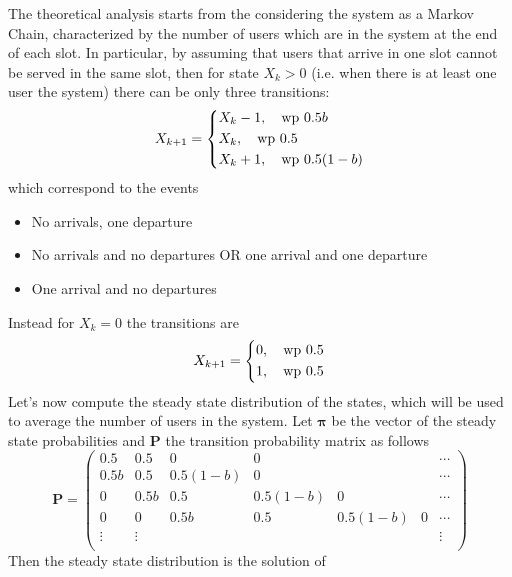 \documentclass[10pt]{article}
\begin{document}
The theoretical analysis starts from the considering the system as a Markov Chain, characterized by the number of users which are in the system at the end of each slot. In particular, by assuming that users that arrive in one slot cannot be served in the same slot, then for state $X_k > 0$ (i.e. when there is at least one user the system) there can be only three transitions:
\begin{equation}
X_{k+1} = 
\begin{dcases}
	X_k - 1, \quad \mbox{wp } 0.5 b \\
	X_k , \quad \mbox{wp } 0.5 \\
	X_k + 1, \quad \mbox{wp } 0.5(1- b) \\
\end{dcases}
\end{equation}
which correspond to the events
\begin{itemize}
\item No arrivals, one departure
\item No arrivals and no departures OR one arrival and one departure
\item One arrival and no departures
\end{itemize}
Instead for $X_k = 0$ the transitions are
\begin{equation}
X_{k+1} = 
\begin{dcases}
	0, \quad \mbox{wp } 0.5 \\
	1, \quad \mbox{wp } 0.5 \\
\end{dcases}
\end{equation}
Let's now compute the steady state distribution of the states, which will be used to average the number of users in the system. Let $\boldsymbol{\pi}$ be the vector of the steady state probabilities and $\mathbf{P}$ the transition probability matrix as follows
\begin{equation}
\mathbf{P} = 
\begin{pmatrix}
	0.5 	& 0.5 	& 0 		& 0			& 	 		&	& \cdots \\
	0.5b 	& 0.5 	& 0.5(1-b) 	& 0 		& 			&	& \cdots \\
	0 		& 0.5b 	& 0.5 		& 0.5(1-b) 	& 0 		&	& \cdots \\
	0 		& 0 	& 0.5b 		& 0.5 		& 0.5(1-b) 	& 0 & \cdots \\
	\vdots 	& \vdots & 			&  			& 			& 	& \vdots \\
\end{pmatrix}
\end{equation} 
Then the steady state distribution is the solution of
\end{document}

